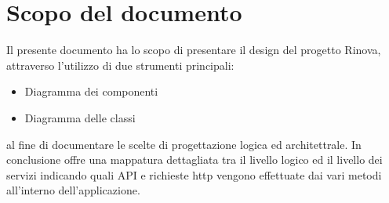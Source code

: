 \setcounter{section}{0}
\setlength{\parindent}{0pt}  %
\setlength{\parskip}{6pt}
\setlength{\itemsep}{3pt}
\section{Scopo del documento}
Il presente documento ha lo scopo di presentare il design del
progetto Rinova, attraverso l'utilizzo di due strumenti principali:
\begin{itemize}
    \item Diagramma dei componenti
    \item Diagramma delle classi
\end{itemize}
al fine di documentare le scelte di progettazione logica ed architettrale.
In conclusione offre una mappatura dettagliata tra il livello logico ed il livello dei servizi
indicando quali API e richieste http vengono effettuate dai vari metodi all'interno dell'applicazione.
